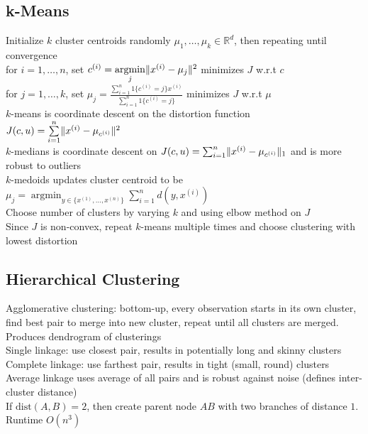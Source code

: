 \documentclass{article}
\newcommand{\R}{\mathbb{R}}
\DeclareMathOperator*{\argmin}{argmin}
\DeclarePairedDelimiter\norm{\lVert}{\rVert}
\begin{document}
\subsection{k-Means}
Initialize $k$ cluster centroids randomly ${\mu_1}, \ldots, {\mu_k} \in \R^d$, then repeating until convergence \\
for $i = 1, \ldots, n$, set $c^{(i)} = \argmin\limits_j \norm{{x^{(i)}}- {\mu_j}}^2$ minimizes $J$ w.r.t $ c$ \\
for $j = 1, \ldots, k$, set ${\mu_j} = \frac{\sum_{i=1}^n 1\{c^{(i)}=j \}{x^{(i)}}}{\sum_{i=1}^n 1\{c^{(i)}=j \}}$ minimizes $J$ w.r.t $ \mu$ \\
$k$-means is coordinate descent on the distortion function $J(c, u) =\sum\limits_{i=1}^n \norm{{x^{(i)}}-{\mu}_{c^{(i)}}}^2$ \\
$k$-medians is coordinate descent on $J( c,  u) =\sum_{i=1}^n \norm{{x^{(i)}}-{\mu}_{c^{(i)}}}_1$ and is more robust to outliers  \\
$k$-medoids updates cluster centroid to be ${\mu_j} = \argmin_{y \in \{x^{(1)}, \ldots, x^{(n)} \}} \sum\limits_{i=1}^n d(y, x^{(i)})$ \\
Choose number of clusters by varying $k$ and using elbow method on $J$ \\
Since $J$ is non-convex, repeat $k$-means multiple times and choose clustering with lowest distortion 

\subsection{Hierarchical Clustering}
Agglomerative clustering: bottom-up, every observation starts in its own cluster, find best pair to merge into new cluster, repeat until all clusters are merged. Produces dendrogram of clusterings \\
Single linkage: use closest pair, results in potentially long and skinny clusters \\
Complete linkage: use farthest pair, results in tight (small, round) clusters \\
Average linkage uses average of all pairs and is robust against noise (defines inter-cluster distance) \\
If $\mbox{dist}(A, B) = 2$, then create parent node $AB$ with two branches of distance $1$. Runtime $O(n^3)$
\end{document}
